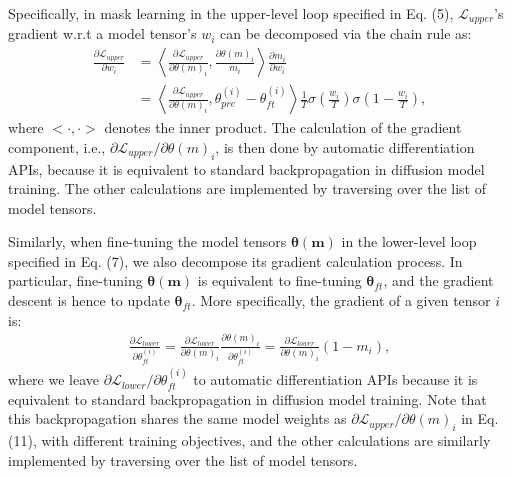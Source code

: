 \documentclass{article}
\begin{document}
Specifically, in mask learning in the upper-level loop specified in Eq. (5), $\mathcal{L}_{upper}$'s gradient w.r.t a model tensor's $w_i$ can be decomposed via the chain rule as:
\begin{align}\label{eq:bp_upper}
\frac{\partial{\mathcal{L}_{upper}}}{\partial{w_i}} & =
\left< \frac{\partial{\mathcal{L}_{upper}}}{\partial{\theta(m)_i}}, 
\frac{\partial{\theta(m)_i}}{m_i} \right>
\frac{\partial m_i}{\partial w_i} \\
&= \left< \frac{\partial{\mathcal{L}_{upper}}}{\partial{\theta(m)_i}},
\theta_{pre}^{(i)} - \theta_{ft}^{(i)} \right> 
\frac{1}{T}\sigma\left(\frac{w_i}{T}\right)\sigma\left(1-\frac{w_i}{T}\right),
\end{align}
where $<\cdot,\cdot>$ denotes the inner product. The calculation of the gradient component, i.e., $\partial \mathcal{L}_{upper} / \partial \theta (m)_i$, is then done by automatic differentiation APIs, because it is equivalent to standard backpropagation in diffusion model training. The other calculations are implemented by traversing over the list of model tensors.

Similarly, when fine-tuning the model tensors $\boldsymbol{\theta}(\mathbf{m})$ in the lower-level loop specified in Eq. (7), we also decompose its gradient calculation process. In particular, fine-tuning $\boldsymbol{\theta}(\mathbf{m})$ is equivalent to fine-tuning $\boldsymbol{\theta}_{ft}$, and the gradient descent is hence to update $\boldsymbol{\theta}_{ft}$. More specifically, the gradient of a given tensor $i$ is:
\begin{align}\label{eq:bp_lower}
\frac{\partial \mathcal{L}_{lower}}{\partial \theta_{ft}^{(i)}} =
\frac{\partial \mathcal{L}_{lower}}{\partial \theta(m)_{i}} 
\frac{\partial \theta(m)_{i}}{\partial \theta_{ft}^{(i)}} = 
\frac{\partial \mathcal{L}_{lower}}{\partial \theta(m)_{i}} (1-m_i),
\end{align}
where we leave $\partial \mathcal{L}_{lower} / \partial \theta_{ft}^{(i)}$ to automatic differentiation APIs because it is equivalent to standard backpropagation in diffusion model training. Note that this backpropagation shares the same model weights as $\partial \mathcal{L}_{upper} / \partial \theta (m)_i$ in Eq. (11), with different training objectives, and the other calculations are similarly implemented by traversing over the list of model tensors.
\end{document}
